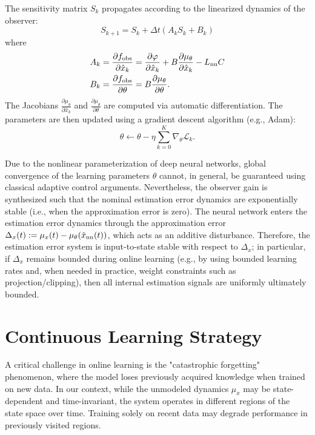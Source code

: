 The sensitivity matrix $S_k$ propagates according to the linearized dynamics of the observer:
\begin{equation}
  S_{k+1} = S_k + \Delta t \left( A_k S_k + B_k \right)
  \label{eq:sensitivity_recursion}
\end{equation}
where
\begin{align}
  A_k &= \frac{\partial f_{\text{obs}}}{\partial \hat{x}_k} = \frac{\partial \varphi}{\partial \hat{x}_k} + B \frac{\partial \mu_\theta}{\partial \hat{x}_k} - L_{\text{nn}} C \\
  B_k &= \frac{\partial f_{\text{obs}}}{\partial \theta} = B \frac{\partial \mu_\theta}{\partial \theta}.
\end{align}
The Jacobians $\frac{\partial \mu_\theta}{\partial \hat{x}_k}$ and $\frac{\partial \mu_\theta}{\partial \theta}$ are computed via automatic differentiation. The parameters are then updated using a gradient descent algorithm (e.g., Adam):
\[
\theta \leftarrow \theta - \eta \sum_{k=0}^{K} \nabla_\theta \mathcal{L}_k.
\]

\begin{remark}
Due to the nonlinear parameterization of deep neural networks, global convergence of the learning parameters $\theta$ cannot, in general, be guaranteed using classical adaptive control arguments.
Nevertheless, the observer gain is synthesized such that the nominal estimation error dynamics are exponentially stable (i.e., when the approximation error is zero).
The neural network enters the estimation error dynamics through the approximation error
$\Delta_x(t) := \mu_x(t) - \mu_\theta(\hat{x}_{\text{nn}}(t))$, which acts as an additive disturbance.
Therefore, the estimation error system is input-to-state stable with respect to $\Delta_x$; in particular, if $\Delta_x$ remains bounded during online learning (e.g., by using bounded learning rates and, when needed in practice, weight constraints such as projection/clipping), then all internal estimation signals are uniformly ultimately bounded.
\end{remark}

\section{Continuous Learning Strategy}\label{sec5}

A critical challenge in online learning is the "catastrophic forgetting" phenomenon, where the model loses previously acquired knowledge when trained on new data. In our context, while the unmodeled dynamics $\mu_x$ may be state-dependent and time-invariant, the system operates in different regions of the state space over time. Training solely on recent data may degrade performance in previously visited regions.

